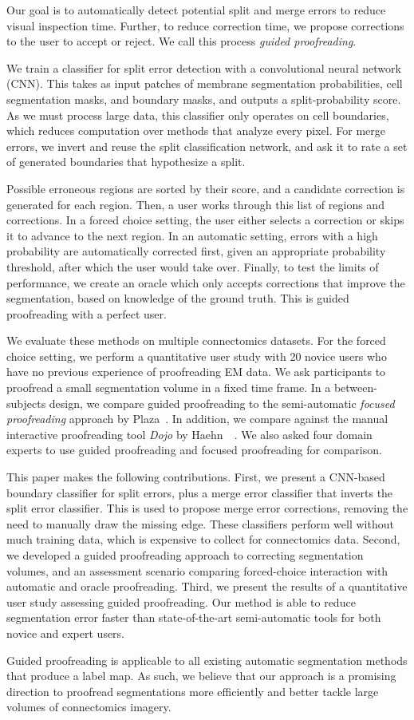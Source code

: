 Our goal is to automatically detect potential split and merge errors to reduce visual
inspection time. Further, to reduce correction time, we propose
corrections to the user to accept or reject. We call this process \textit{guided
proofreading}.

We train a classifier for split error detection with a convolutional neural network
(CNN). This takes as input patches of membrane segmentation probabilities, cell
segmentation masks, and boundary masks, and outputs a split-probability score. As we
must process large data, this classifier only operates on cell boundaries, which
reduces computation over methods that analyze every pixel. For merge errors, we
invert and reuse the split classification network, and ask it to rate a
set of generated boundaries that hypothesize a split. 

Possible erroneous regions are sorted by their score, and a candidate correction is generated for each
region. Then, a user works through this list of regions and corrections. In a
forced choice setting, the user either selects a correction or skips it to
advance to the next region. In an automatic setting, errors with a high probability are automatically corrected first, given an appropriate
probability threshold, after which the user would take over. Finally, to test
the limits of performance, we create an oracle which only accepts corrections
that improve the segmentation, based on knowledge of the ground truth. This is
guided proofreading with a perfect user.

We evaluate these methods on multiple connectomics datasets. For the forced
choice setting, we perform a quantitative user study with 20 novice users who
have no previous experience of proofreading EM data. We ask participants to
proofread a small segmentation volume in a fixed time frame. In a
between-subjects design, we compare guided proofreading to the semi-automatic
\textit{focused proofreading} approach by Plaza~\cite{focused_proofreading}. In
addition, we compare against the manual interactive proofreading tool
\textit{Dojo} by Haehn~\etal~\cite{haehn_dojo_2014}. We also asked four domain
experts to use guided proofreading and focused proofreading for comparison.

This paper makes the following contributions.
%
First, we present a CNN-based boundary classifier for split errors, plus a merge
error classifier that inverts the split error classifier. This is used to
propose merge error corrections, removing the need to manually draw the missing
edge. These classifiers perform well without much training data, which is
expensive to collect for connectomics data.
%
Second, we developed a guided proofreading approach to correcting segmentation
volumes, and an assessment scenario comparing forced-choice interaction with
automatic and oracle proofreading.
%
Third, we present the results of a quantitative user study assessing
guided proofreading. Our method is able to reduce segmentation
error faster than state-of-the-art semi-automatic tools for both novice and
expert users.

Guided proofreading is applicable to all existing automatic segmentation methods that
produce a label map. As such, we believe that our approach is a promising
direction to proofread segmentations more efficiently and better tackle large
volumes of connectomics imagery.